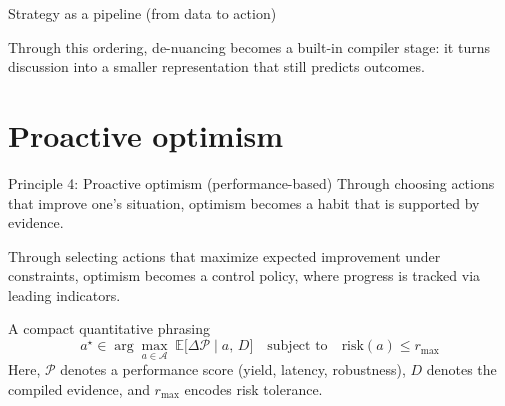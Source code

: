 \documentclass[presentation,aspectratio=169,11pt]{beamer}
\begin{document}
\begin{frame}{Strategy as a pipeline (from data to action)}
\centering
{}

\vspace{0.6em}
\justifying
\small
Through this ordering, de-nuancing becomes a built-in compiler stage: it turns discussion into a smaller representation that still predicts outcomes.
\end{frame}

\section{Proactive optimism}

\begin{frame}{Principle 4: Proactive optimism (performance-based)}
\justifying
Through choosing actions that improve one's situation, optimism becomes a habit that is supported by evidence.

\vspace{0.6em}
Through selecting actions that maximize expected improvement under constraints, optimism becomes a control policy, where progress is tracked via leading indicators.

\vspace{0.75em}
\begin{block}{A compact quantitative phrasing}
\justifying
\vspace{-0.5em}
$$
 a^{\star} \in \arg\max_{a\in\mathcal{A}}\; \mathbb{E}\bigl[\Delta \mathcal{P}\mid a,\, D\bigr]\quad\text{subject to}\quad \text{risk}(a)\le r_{\max}
$$
\vspace{-0.2em}
\small
Here, $\mathcal{P}$ denotes a performance score (yield, latency, robustness), $D$ denotes the compiled evidence, and $r_{\max}$ encodes risk tolerance.
\end{block}
\end{frame}
\end{document}
